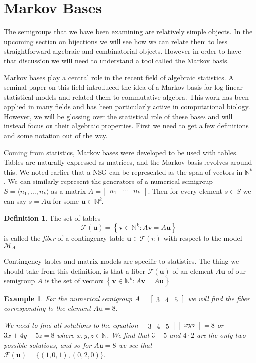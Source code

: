 \documentclass[11pt]{amsart}
\theoremstyle{plain}
\newtheorem{exa}{Example}
\theoremstyle{definition}
\newtheorem{defi}{Definition}
\begin{document}
\section{Markov Bases}
The semigroups that we have been examining are relatively simple objects. In the upcoming section on bijections we will see how we can relate them to less straightforward algebraic and combinatorial objects. However in order to have that discussion we will need to understand a tool called the Markov basis.

Markov bases play a central role in the recent field of algebraic statistics.
A seminal paper\cite{markstats} on this field introduced the idea of a
Markov basis for log linear statistical models and related them
to commutative algebra. This work has been applied in many fields and has been
particularly active in computational biology\cite{bernd}. However, we will be glossing over
the statistical role of these bases and will instead focus on their algebraic
properties. First we need to get a few definitions and some notation out of the
way.

Coming from statistics, Markov bases were developed to be used with tables.
Tables are naturally expressed as matrices, and the Markov basis
revolves around this. We noted earlier that a NSG can be represented as the
span of vectors in $\mathbb{N}^k$. We can similarly represent the generators of a numerical semigroup $S=\langle n_1,\dots,n_k \rangle$ as a
matrix $A=\left[\begin{array}{rrr}n_1&\cdots&n_k\end{array}\right]$. Then for
every element $s\in S$ we can say $s=A\mathbf{u}$ for some $\mathbf{u}\in \mathbb{N}^k$.

\begin{defi}
  \cite{bernd}
  The set of tables
  \[\mathcal{F}(\mathbf{u})=\left\{\mathbf{v}\in \mathbb{N}^k:A\mathbf{v}=A\mathbf{u}\right\}\]
  is called the \emph{fiber} of a contingency table $\mathbf{u}\in \mathcal{T}(n)$ with
  respect to the model $\mathcal{M}_A$
\end{defi}

Contingency tables and matrix models are specific to statistics. The thing we
should take from this definition, is that a fiber $\mathcal{F}(\mathbf{u})$ of an element
$A\mathbf{u}$ of our semigroup $A$ is the set of vectors $\left\{\mathbf{v}\in \mathbb{N}^k:A\mathbf{v}=A\mathbf{u}
\right\}$
\begin{exa}
  For the numerical semigroup $A=\left[\begin{array}{rrr}3&4&5\end{array}\right]$
  we will find the fiber corresponding to the element $A\mathbf{u}=8$.

  We need to find all solutions to the equation $\left[\begin{array}{rrr}3&4&5
\end{array}\right]\left[\begin{array}{rrr}x y z \end{array}\right]=8$ or
$3x+4y+5z=8$ where $x,y,z\in \mathbb{N}$. We find that $3+5$ and $4\cdot 2$ are
the only two possible solutions, and so for $A\mathbf{u}=8$ we see that $\mathcal{F}(\mathbf{u})=
\{(1,0,1),(0,2,0)\}$.
\end{exa}
\end{document}
